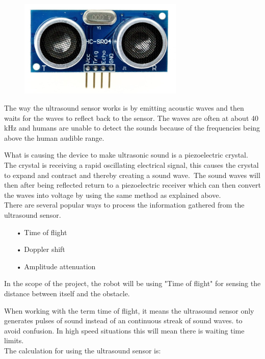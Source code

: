 \begin{figure}[!ht]
	\centering
	\includegraphics[width=0.7\textwidth]{figures/hc04.jpg}
	\caption{}
	\label{HC-SR04}
\end{figure}


The way the ultrasound sensor works is by emitting acoustic waves and then waits for the waves to reflect back to the sensor. The waves are often at about 40 kHz and humans are unable to detect the sounds because of the frequencies being above the human audible range.\

What is causing the device to make ultrasonic sound is a piezoelectric crystal. The crystal is receiving a rapid oscillating electrical signal, this causes the crystal to expand and contract and thereby creating a sound wave.\ The sound waves will then after being reflected return to a piezoelectric receiver which can then convert the waves into voltage by using the same method as explained above. \\

There are several popular ways to process the information gathered from the ultrasound sensor.\
\begin{enumerate}
	\item[•]Time of flight
	\item[•]Doppler shift
	\item[•]Amplitude attenuation
\end{enumerate}

In the scope of the project, the robot will be using "Time of flight" for sensing the distance between itself and the obstacle.\

When working with the term time of flight, it means the ultrasound sensor only generates pulses of sound instead of an continuous streak of sound waves. to avoid confusion. In high speed situations this will mean there is waiting time limits.\\ 

The calculation for using the ultrasound sensor is:\\

